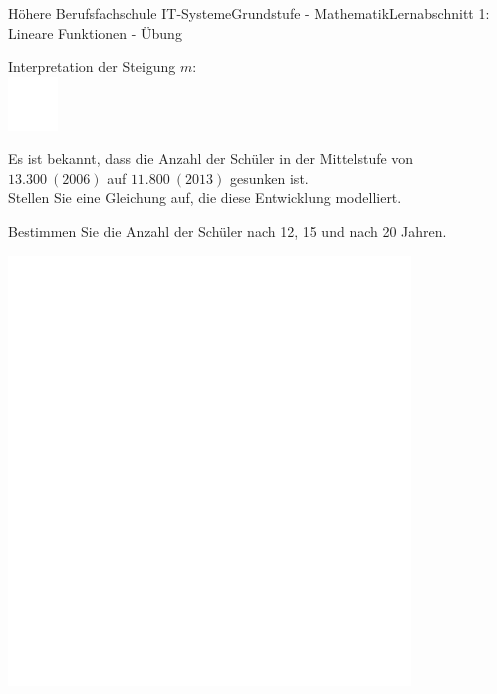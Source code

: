 \documentclass[oneside,openany,headings=optiontotoc,11pt,numbers=noenddot]{scrreprt}
\begin{document}
\begin{worksheet}{Höhere Berufsfachschule IT-Systeme}{Grundstufe - Mathematik}{Lernabschnitt 1: Lineare Funktionen - Übung}
\begin{framed}
		\end{framed}
		\normalsize
		\begin{framed}
			\noindent
			Interpretation der Steigung \(m\):\\
			\includegraphics[width=0.1\textwidth]{../../empty.jpg}\\
		\end{framed}
		\par\bigskip\noindent
		\begin{framed}
			\noindent
			Es ist bekannt, dass die Anzahl der Schüler in der Mittelstufe von \(13.300\ (2006)\) auf \(11.800\ (2013)\) gesunken ist.\\
			Stellen Sie eine Gleichung auf, die diese Entwicklung modelliert.\\
			\par\noindent
			Bestimmen Sie die Anzahl der Schüler nach 12, 15 und nach 20 Jahren.
		\end{framed}
		\begin{framed}
			\includegraphics[width=0.8\textwidth]{../../empty.jpg}
		\end{framed}
		\newpage
		

\end{worksheet}
\end{document}
